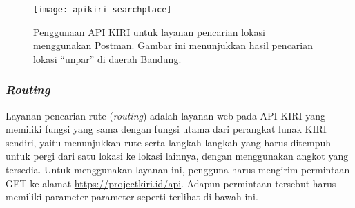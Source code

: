 \begin{figure}[t]
    \centering
    \texttt{[image: apikiri-searchplace]}
    \caption[Penggunaan API KIRI untuk layanan pencarian lokasi]{Penggunaan API KIRI untuk layanan pencarian lokasi menggunakan Postman. Gambar ini menunjukkan hasil pencarian lokasi ``unpar'' di daerah Bandung.}
    \label{fig:kiri-api-searchplace-usage}
\end{figure}

\subsubsection{\textit{Routing}}
\label{sec:kiri-api-routing}

Layanan pencarian rute (\textit{routing}) adalah layanan web pada API KIRI yang memiliki fungsi yang sama dengan fungsi utama dari perangkat lunak KIRI sendiri, yaitu menunjukkan rute serta langkah-langkah yang harus ditempuh untuk pergi dari satu lokasi ke lokasi lainnya, dengan menggunakan angkot yang tersedia. Untuk menggunakan layanan ini, pengguna harus mengirim permintaan GET ke alamat \href{https://projectkiri.id/api}{https://projectkiri.id/api}. Adapun permintaan tersebut harus memiliki parameter-parameter seperti terlihat di bawah ini.
\newpage %
